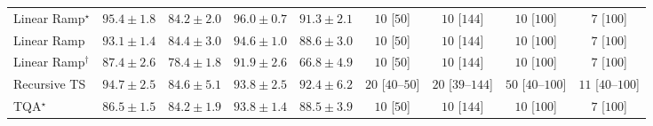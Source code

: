 \begin{tabular}{l|cccc|cccc|}
Linear Ramp$^\star$ & {\cellcolor[HTML]{670864}} \color[HTML]{F1F1F1} $95.4\pm 1.8$ & {\cellcolor[HTML]{8A55A7}} \color[HTML]{F1F1F1} $84.2\pm 2.0$ & {\cellcolor[HTML]{62065F}} \color[HTML]{F1F1F1} $96.0\pm 0.7$ & {\cellcolor[HTML]{831A83}} \color[HTML]{F1F1F1} $91.3\pm 2.1$ & {\cellcolor[HTML]{FFF6F2}} \color[HTML]{000000} $10$ [$50$] & {\cellcolor[HTML]{FFF6F2}} \color[HTML]{000000} $10$ [$144$] & {\cellcolor[HTML]{FFF6F2}} \color[HTML]{000000} $10$ [$100$] & {\cellcolor[HTML]{FFF6F2}} \color[HTML]{000000} $7$ [$100$] \\
Linear Ramp & {\cellcolor[HTML]{7C0E78}} \color[HTML]{F1F1F1} $93.1\pm 1.4$ & {\cellcolor[HTML]{8A52A5}} \color[HTML]{F1F1F1} $84.4\pm 3.0$ & {\cellcolor[HTML]{6F0A6B}} \color[HTML]{F1F1F1} $94.6\pm 1.0$ & {\cellcolor[HTML]{863293}} \color[HTML]{F1F1F1} $88.6\pm 3.0$ & {\cellcolor[HTML]{FFF6F2}} \color[HTML]{000000} $10$ [$50$] & {\cellcolor[HTML]{FFF6F2}} \color[HTML]{000000} $10$ [$144$] & {\cellcolor[HTML]{FFF6F2}} \color[HTML]{000000} $10$ [$100$] & {\cellcolor[HTML]{FFF6F2}} \color[HTML]{000000} $7$ [$100$] \\
Linear Ramp$^\dagger$ & {\cellcolor[HTML]{873D9A}} \color[HTML]{F1F1F1} $87.4\pm 2.6$ & {\cellcolor[HTML]{8C80BB}} \color[HTML]{F1F1F1} $78.4\pm 1.8$ & {\cellcolor[HTML]{821580}} \color[HTML]{F1F1F1} $91.9\pm 2.6$ & {\cellcolor[HTML]{AEC7E0}} \color[HTML]{000000} $66.8\pm 4.9$ & {\cellcolor[HTML]{FFF6F2}} \color[HTML]{000000} $10$ [$50$] & {\cellcolor[HTML]{FFF6F2}} \color[HTML]{000000} $10$ [$144$] & {\cellcolor[HTML]{FFF6F2}} \color[HTML]{000000} $10$ [$100$] & {\cellcolor[HTML]{FFF6F2}} \color[HTML]{000000} $7$ [$100$] \\
Recursive TS & {\cellcolor[HTML]{6E096A}} \color[HTML]{F1F1F1} $94.7\pm 2.5$ & {\cellcolor[HTML]{8A51A5}} \color[HTML]{F1F1F1} $84.6\pm 5.1$ & {\cellcolor[HTML]{760C71}} \color[HTML]{F1F1F1} $93.8\pm 2.5$ & {\cellcolor[HTML]{81117D}} \color[HTML]{F1F1F1} $92.4\pm 6.2$ & {\cellcolor[HTML]{FFF3EF}} \color[HTML]{000000} $20$ [$40$--$50$] & {\cellcolor[HTML]{FFF3EF}} \color[HTML]{000000} $20$ [$39$--$144$] & {\cellcolor[HTML]{FEEBE8}} \color[HTML]{000000} $50$ [$40$--$100$] & {\cellcolor[HTML]{FFF5F1}} \color[HTML]{000000} $11$ [$40$--$100$] \\
TQA$^\star$ & {\cellcolor[HTML]{88449E}} \color[HTML]{F1F1F1} $86.5\pm 1.5$ & {\cellcolor[HTML]{8A55A7}} \color[HTML]{F1F1F1} $84.2\pm 1.9$ & {\cellcolor[HTML]{760C71}} \color[HTML]{F1F1F1} $93.8\pm 1.4$ & {\cellcolor[HTML]{863394}} \color[HTML]{F1F1F1} $88.5\pm 3.9$ & {\cellcolor[HTML]{FFF6F2}} \color[HTML]{000000} $10$ [$50$] & {\cellcolor[HTML]{FFF6F2}} \color[HTML]{000000} $10$ [$144$] & {\cellcolor[HTML]{FFF6F2}} \color[HTML]{000000} $10$ [$100$] & {\cellcolor[HTML]{FFF6F2}} \color[HTML]{000000} $7$ [$100$] \\

\end{tabular}
